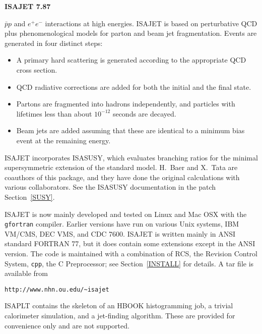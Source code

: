 \centerline{\Large\bf ISAJET 7.87}
$\bar pp$ and $e^+e^-$ interactions at high energies. 
ISAJET is based on
perturbative QCD plus phenomenological models for parton and beam jet
fragmentation. Events are generated in four distinct steps:
\begin{itemize}
\item A primary hard scattering is generated according to the
appropriate QCD cross section.
\item QCD radiative corrections are added for both the initial and the
final state.
\item Partons are fragmented into hadrons independently, and particles
with lifetimes less than about $10^{-12}$ seconds are decayed.
\item Beam jets are added assuming that these are identical to a
minimum bias event at the remaining energy.
\end{itemize}

      ISAJET incorporates ISASUSY, which evaluates branching ratios for
the minimal supersymmetric extension of the standard model. H.~Baer and
X.~Tata are coauthors of this package, and they have done the original
calculations with various collaborators. See the ISASUSY documentation
in the patch Section~\ref{SUSY}.

      ISAJET is now mainly developed and tested on Linux and Mac OSX
with the \verb|gfortran| compiler. Earlier versions have run on various
Unix systems, IBM VM/CMS, DEC VMS, and CDC 7600. ISAJET is written
mainly in ANSI standard FORTRAN 77, but it does contain some extensions
except in the ANSI version. The code is maintained with a combination of
RCS, the Revision Control System, \verb|cpp|, the C Preprocessor; see
Section~\ref{INSTALL} for details. A tar file is available from
\begin{verbatim}
http://www.nhn.ou.edu/~isajet
\end{verbatim}

      ISAPLT contains the skeleton of an HBOOK histogramming job, a
trivial calorimeter simulation, and a jet-finding algorithm. These are
provided for convenience only and are not supported.
